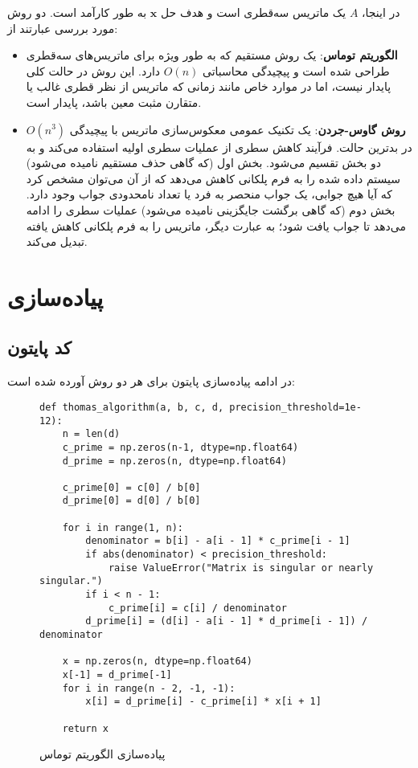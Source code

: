 \documentclass[a4paper,12pt]{article}
\begin{document}
در اینجا، \(A\) یک ماتریس سه‌قطری است و هدف حل \(\mathbf{x}\) به طور کارآمد است. دو روش مورد بررسی عبارتند از:
\begin{itemize}
    \item \textbf{الگوریتم توماس}: یک روش مستقیم که به طور ویژه برای ماتریس‌های سه‌قطری طراحی شده است و پیچیدگی محاسباتی \(O(n)\) دارد. این روش در حالت کلی پایدار نیست، اما در موارد خاص مانند زمانی که ماتریس از نظر قطری غالب یا متقارن مثبت معین باشد، پایدار است.
    \item \textbf{روش گاوس-جردن}: یک تکنیک عمومی معکوس‌سازی ماتریس با پیچیدگی \(O(n^3)\) در بدترین حالت. فرآیند کاهش سطری از عملیات سطری اولیه استفاده می‌کند و به دو بخش تقسیم می‌شود. بخش اول (که گاهی حذف مستقیم نامیده می‌شود) سیستم داده شده را به فرم پلکانی کاهش می‌دهد که از آن می‌توان مشخص کرد که آیا هیچ جوابی، یک جواب منحصر به فرد یا تعداد نامحدودی جواب وجود دارد. بخش دوم (که گاهی برگشت جایگزینی نامیده می‌شود) عملیات سطری را ادامه می‌دهد تا جواب یافت شود؛ به عبارت دیگر، ماتریس را به فرم پلکانی کاهش یافته تبدیل می‌کند.
\end{itemize}

\newpage
\section*{پیاده‌سازی}
\subsection*{کد پایتون}
در ادامه پیاده‌سازی پایتون برای هر دو روش آورده شده است:

\begin{figure}[H]
\caption{پیاده‌سازی الگوریتم توماس}
\begin{latin}
\begin{verbatim}
def thomas_algorithm(a, b, c, d, precision_threshold=1e-12):
    n = len(d)
    c_prime = np.zeros(n-1, dtype=np.float64)
    d_prime = np.zeros(n, dtype=np.float64)

    c_prime[0] = c[0] / b[0]
    d_prime[0] = d[0] / b[0]

    for i in range(1, n):
        denominator = b[i] - a[i - 1] * c_prime[i - 1]
        if abs(denominator) < precision_threshold:
            raise ValueError("Matrix is singular or nearly singular.")
        if i < n - 1:
            c_prime[i] = c[i] / denominator
        d_prime[i] = (d[i] - a[i - 1] * d_prime[i - 1]) / denominator

    x = np.zeros(n, dtype=np.float64)
    x[-1] = d_prime[-1]
    for i in range(n - 2, -1, -1):
        x[i] = d_prime[i] - c_prime[i] * x[i + 1]

    return x
\end{verbatim}
\end{latin}
\end{figure}
\end{document}
